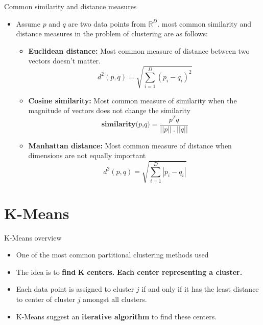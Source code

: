\documentclass[serif, aspectratio=169]{beamer}
\begin{document}
\begin{frame}{Common similarity and distance measures}
    \begin{itemize}
        \item Assume \( p \) and \( q \) are two data points from $ \mathbb{R}^D$. most common similarity and distance measures in the problem of clustering are as follows:
        \begin{itemize}
            \item \textbf{Euclidean distance:} Most common measure of distance between two vectors doesn't matter.
            \[
            d^2(p,q)=\sqrt{{\sum_{i=1}^{D}{(p_i-q_i)^2}}}
            \]
            \item \textbf{Cosine similarity:} Most common measure of similarity when the magnitude of vectors does not change the similarity
            \[
            \textbf{similarity(\(p\),\(q\))}=\frac{p^T q}{||p|| \ . \ ||q||}
            \]
            \item \textbf{Manhattan distance:} Most common measure of distance when dimensions are not equally important
            \[
            d^2(p,q)=\sqrt{\sum_{i=1}^{D} |p_i-q_i|}
            \]
        \end{itemize}
    \end{itemize}
\end{frame}

\section{K-Means}
\begin{frame}{K-Means overview}
    \begin{itemize}
        \item One of the most common partitional clustering methods used
        \item The idea is to \textbf{find} \( \mathbf{K} \) \textbf{centers.} \textbf{Each center representing a cluster.}
        \item Each data point is assigned to cluster \( j \) if and only if it has the least distance to center of cluster \( j \) amongst all clusters.
        \item K-Means suggest an \textbf{iterative algorithm} to find these centers.
    \end{itemize}
\end{frame}
\end{document}
